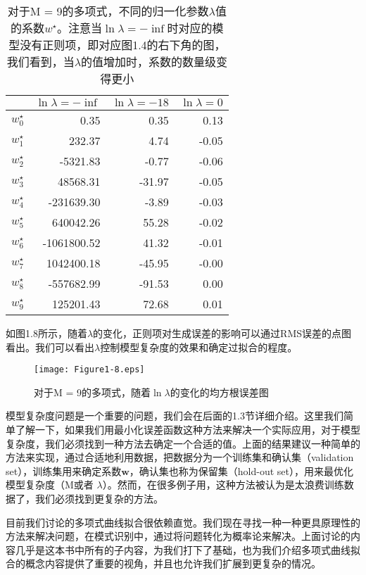	\begin{table}[b]
		\parbox{.4\textwidth}{\caption{对于M = 9的多项式，不同的归一化参数$\lambda$值的系数$w^{\star}$。注意当$\ln \lambda = -\inf$时对应的模型没有正则项，即对应图1.4的右下角的图，我们看到，当$\lambda$的值增加时，系数的数量级变得更小}}
		\parbox{.5\textwidth}{
			\begin{tabular}{r|rrr}
				& $\ln \lambda = -\inf$ & $\ln \lambda = -18$ & $\ln \lambda = 0$ \\
				\hline
				$w_0^{\star}$ & 0.35 & 0.35 & 0.13\\
				$w_1^{\star}$ & 232.37 & 4.74 & -0.05 \\
				$w_2^{\star}$ & -5321.83 & -0.77 & -0.06 \\
				$w_3^{\star}$ & 48568.31 & -31.97 & -0.05 \\
				$w_4^{\star}$ & -231639.30 & -3.89 & -0.03 \\
				$w_5^{\star}$ & 640042.26 & 55.28 & -0.02\\
				$w_6^{\star}$ & -1061800.52 & 41.32 & -0.01 \\
				$w_7^{\star}$ & 1042400.18 & -45.95 & -0.00 \\
				$w_8^{\star}$ & -557682.99 & -91.53 & 0.00 \\
				$w_9^{\star}$ & 125201.43 & 72.68 & 0.01
			\end{tabular}
		}
	\end{table}
	
	如图1.8所示，随着$\lambda$的变化，正则项对生成误差的影响可以通过RMS误差的点图看出。我们可以看出$\lambda$控制模型复杂度的效果和确定过拟合的程度。
	
	\begin{figure}[t]
		\parbox{.4\textwidth}{\caption{对于M = 9的多项式，随着$\ln \lambda$的变化的均方根误差图}}
		\parbox{.5\textwidth}{\texttt{[image: Figure1-8.eps]}}
	\end{figure}
	
	模型复杂度问题是一个重要的问题，我们会在后面的1.3节详细介绍。这里我们简单了解一下，如果我们用最小化误差函数这种方法来解决一个实际应用，对于模型复杂度，我们必须找到一种方法去确定一个合适的值。上面的结果建议一种简单的方法来实现，通过合适地利用数据，把数据分为一个训练集和确认集（validation set），训练集用来确定系数$\mathbf{w}$，确认集也称为保留集（hold-out set），用来最优化模型复杂度（M或者 $\lambda$）。然而，在很多例子用，这种方法被认为是太浪费训练数据了，我们必须找到更复杂的方法。
	
	目前我们讨论的多项式曲线拟合很依赖直觉。我们现在寻找一种一种更具原理性的方法来解决问题，在模式识别中，通过将问题转化为概率论来解决。上面讨论的内容几乎是这本书中所有的子内容，为我们打下了基础，也为我们介绍多项式曲线拟合的概念内容提供了重要的视角，并且也允许我们扩展到更复杂的情况。
	
